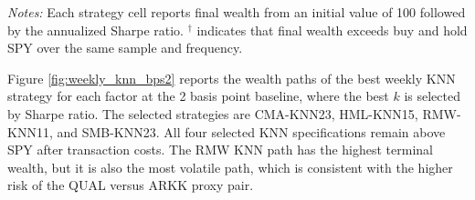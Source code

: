 \documentclass[investment,article,submit,pdftex,moreauthors]{Definitions/mdpi}
\begin{document}
\begin{table}[H]
\centering
\caption{Selected strategy performance at 0, 1, and 2 bps per switch}
\label{tab:cost_012}
\scriptsize
{}
\begin{flushleft}
\footnotesize{\textit{Notes:} Each strategy cell reports final wealth from an initial value of 100 followed by the annualized Sharpe ratio. \(^{\dagger}\) indicates that final wealth exceeds buy and hold SPY over the same sample and frequency.}
\end{flushleft}
\end{table}

Figure \ref{fig:weekly_knn_bps2} reports the wealth paths of the best weekly KNN strategy for each factor at the 2 basis point baseline, where the best \(k\) is selected by Sharpe ratio. The selected strategies are CMA-KNN23, HML-KNN15, RMW-KNN11, and SMB-KNN23. All four selected KNN specifications remain above SPY after transaction costs. The RMW KNN path has the highest terminal wealth, but it is also the most volatile path, which is consistent with the higher risk of the QUAL versus ARKK proxy pair.
\end{document}
